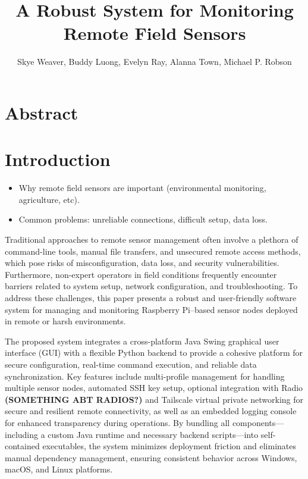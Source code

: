 \documentclass{article}
\title{A Robust System for Monitoring Remote Field Sensors}
\author{
  Skye Weaver,
  Buddy Luong,
  Evelyn Ray,
  Alanna Town,
  Michael P. Robson
}
\begin{document}
\maketitle

\section{Abstract}

\section{Introduction}

\begin{itemize}
    \item Why remote field sensors are important (environmental monitoring, agriculture, etc).
    \item Common problems: unreliable connections, difficult setup, data loss.
\end{itemize}

Traditional approaches to remote sensor management often involve a plethora of command-line tools, manual file transfers, and unsecured remote access methods, which pose risks of misconfiguration, data loss, and security vulnerabilities. Furthermore, non-expert operators in field conditions frequently encounter barriers related to system setup, network configuration, and troubleshooting. To address these challenges, this paper presents a robust and user-friendly software system for managing and monitoring Raspberry Pi–based sensor nodes deployed in remote or harsh environments. 

The proposed system integrates a cross-platform Java Swing graphical user interface (GUI) with a flexible Python backend to provide a cohesive platform for secure configuration, real-time command execution, and reliable data synchronization. Key features include multi-profile management for handling multiple sensor nodes, automated SSH key setup, optional integration with Radio \textbf{(SOMETHING ABT RADIOS?)} and Tailscale virtual private networking for secure and resilient remote connectivity, as well as an embedded logging console for enhanced transparency during operations. By bundling all components—including a custom Java runtime and necessary backend scripts—into self-contained executables, the system minimizes deployment friction and eliminates manual dependency management, ensuring consistent behavior across Windows, macOS, and Linux platforms.

\end{document}

